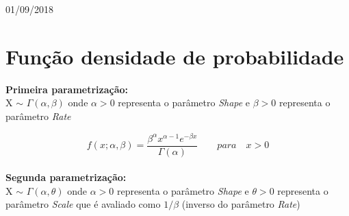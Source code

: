 \begin{titlepage}

{\large 01/09/2018}\\[2cm] %


 

\vfill %

\end{titlepage}


\section{Função densidade de probabilidade}

\textbf{Primeira parametrização:}\\

X $\sim$ \begin{math} \Gamma(\alpha, \beta) \end{math} onde \begin{math} \alpha > 0 \end{math} representa o parâmetro \textit{Shape} e \begin{math} \beta > 0 \end{math} representa o parâmetro \textit{Rate}

\begin{equation}
f(x; \alpha, \beta )=\frac{\beta^{\alpha}x^{\alpha-1}e^{-\beta x}}{\Gamma(\alpha)} \qquad para \quad x > 0
\end{equation}\\

\textbf{Segunda parametrização:}\\

X $\sim$ \begin{math} \Gamma(\alpha, \theta) \end{math} onde \begin{math} \alpha > 0 \end{math} representa o parâmetro \textit{Shape} e \begin{math} \theta > 0 \end{math} representa o parâmetro \textit{Scale} que é avaliado como \begin{math} 1/ \beta \end{math} (inverso do parâmetro \textit{Rate})

